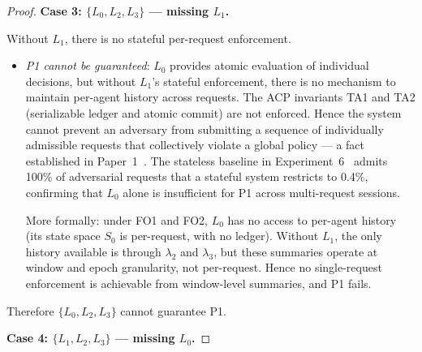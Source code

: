 \documentclass[11pt]{article}
\newcommand{\Layer}[1]{L_{#1}}
\newcommand{\State}[1]{S_{#1}}
\newcommand{\Sum}[1]{\lambda_{#1}}
\begin{document}
\begin{proof}
\medskip
\noindent\textbf{Case 3: $\{\Layer{0}, \Layer{2}, \Layer{3}\}$ --- missing
$\Layer{1}$.}

Without $\Layer{1}$, there is no stateful per-request enforcement.
\begin{itemize}[noitemsep]
  \item \emph{P1 cannot be guaranteed}: $\Layer{0}$ provides atomic
    evaluation of individual decisions, but without $\Layer{1}$'s stateful
    enforcement, there is no mechanism to maintain per-agent history across
    requests. The ACP invariants TA1 and TA2 (serializable ledger and atomic
    commit) are not enforced. Hence the system cannot prevent an adversary
    from submitting a sequence of individually admissible requests that
    collectively violate a global policy --- a fact established in
    Paper~1~\cite{fernandez2026b}. The stateless baseline in
    Experiment~6~\cite{fernandez2026b} admits 100\% of adversarial requests
    that a stateful system restricts to 0.4\%, confirming that $\Layer{0}$
    alone is insufficient for P1 across multi-request sessions.

    More formally: under FO1 and FO2, $\Layer{0}$ has no access to
    per-agent history (its state space $\State{0}$ is per-request, with no
    ledger). Without $\Layer{1}$, the only history available is through
    $\Sum{2}$ and $\Sum{3}$, but these summaries operate at window and epoch
    granularity, not per-request. Hence no single-request enforcement is
    achievable from window-level summaries, and P1 fails.
\end{itemize}
Therefore $\{\Layer{0},\Layer{2},\Layer{3}\}$ cannot guarantee P1.

\medskip
\noindent\textbf{Case 4: $\{\Layer{1}, \Layer{2}, \Layer{3}\}$ --- missing
$\Layer{0}$.}


\end{proof}
\end{document}

